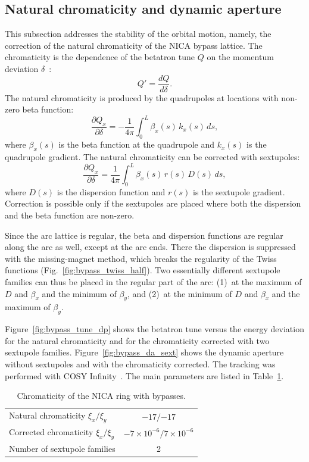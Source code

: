 \documentclass[%
  aps,
  pra,
  preprint,
  a4paper,
  amsmath,
  amssymb,
  floatfix,
  longbibliography,
  superscriptaddress
]{revtex4-2}
\begin{document}
\subsection{Natural chromaticity and dynamic aperture}

This subsection addresses the stability of the orbital motion, namely, the
correction of the natural chromaticity of the NICA bypass lattice. The
chromaticity is the dependence of the betatron tune $Q$ on the momentum
deviation $\delta$~\cite{Guiducci:1992kb}:
\begin{equation}
  Q' = \frac{dQ}{d\delta} .
\end{equation}
The natural chromaticity is produced by the quadrupoles at locations with
non-zero beta function:
\begin{equation}
  \frac{\partial Q_x}{\partial\delta} = -\frac{1}{4\pi}\int_0^L \beta_x(s)\,k_x(s)\,ds,
\end{equation}
where $\beta_x(s)$ is the beta function at the quadrupole and $k_x(s)$ is the
quadrupole gradient. The natural chromaticity can be corrected with
sextupoles:
\begin{equation}
  \frac{\partial Q_x}{\partial\delta} = \frac{1}{4\pi}\int_0^L \beta_x(s)\,r(s)\,D(s)\,ds,
\end{equation}
where $D(s)$ is the dispersion function and $r(s)$ is the sextupole gradient.
Correction is possible only if the sextupoles are placed where both the
dispersion and the beta function are non-zero.

Since the arc lattice is regular, the beta and dispersion functions are
regular along the arc as well, except at the arc ends. There the dispersion is
suppressed with the missing-magnet method, which breaks the regularity of the
Twiss functions (Fig.~\ref{fig:bypass_twiss_half}). Two essentially different
sextupole families can thus be placed in the regular part of the arc:
(1)~at the maximum of $D$ and $\beta_x$ and the minimum of $\beta_y$, and
(2)~at the minimum of $D$ and $\beta_x$ and the maximum of $\beta_y$.

Figure~\ref{fig:bypass_tune_dp} shows the betatron tune versus the energy
deviation for the natural chromaticity and for the chromaticity corrected with
two sextupole families. Figure~\ref{fig:bypass_da_sext} shows the dynamic
aperture without sextupoles and with the chromaticity corrected. The tracking
was performed with COSY Infinity~\cite{Makino:2006sx}. The main parameters are
listed in Table~\ref{tab:bypass_chrom}.

\begin{table}[htbp]
  \centering
  \caption{Chromaticity of the NICA ring with bypasses.}
  \label{tab:bypass_chrom}
  \begin{tabular}{lc}
    \toprule
    Natural chromaticity $\xi_x/\xi_y$ & $-17/{-17}$ \\
    Corrected chromaticity $\xi_x/\xi_y$ & $-7\times10^{-6}/7\times10^{-6}$ \\
    Number of sextupole families & 2 \\
    \bottomrule
  \end{tabular}
\end{table}
\end{document}
